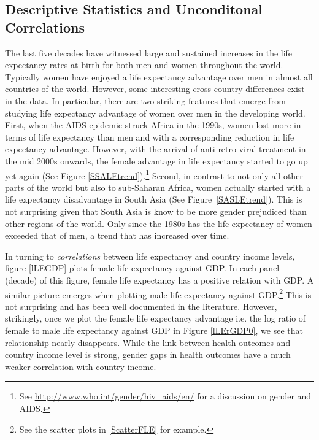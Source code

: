 \documentclass[11pt]{article}
\begin{document}
\begin{spacing}{1.4}
\subsection{Descriptive Statistics and Unconditonal Correlations} 
The last five decades have witnessed large and sustained increases in the life 
expectancy rates at birth for both men and women throughout the world. Typically 
women have enjoyed a life expectancy advantage over men in almost all countries 
of the world. However, some interesting cross country differences exist in the 
data. In particular, there are two striking features that emerge from studying 
life expectancy advantage of women over men in the developing world. First, when 
the AIDS epidemic struck Africa in the 1990s, women lost more in terms of life 
expectancy than men and with a corresponding reduction in life expectancy 
advantage. However, with the arrival of anti-retro viral treatment in the mid 
2000s onwards, the female advantage in life expectancy started to go up yet 
again (See Figure \ref{SSALEtrend}).\footnote{See 
\url{http://www.who.int/gender/hiv_aids/en/} for a discussion on gender and 
AIDS.} Second, in contrast to not only all other parts of the world but also to 
sub-Saharan Africa, women actually started with a life expectancy disadvantage 
in South Asia (See Figure~\ref{SASLEtrend}). This is not surprising given that 
South Asia is know to be more gender prejudiced than other regions of the world. 
Only since the 1980s has the life expectancy of women exceeded that of men, 
a trend that has increased over time.

In turning to \emph{correlations} between life expectancy and country income
levels, figure \ref{lLEGDP} plots female life expectancy against GDP. In each 
panel (decade) of this figure, female life expectancy has a positive relation 
with GDP. A similar picture emerges when plotting male life expectancy against 
GDP.\footnote{See the scatter plots in \ref{ScatterFLE} for example.} This is 
not surprising and has been well documented in the literature. However, 
strikingly, once we plot the female life expectancy advantage i.e. the log 
ratio of female to male life expectancy against GDP in Figure \ref{lLErGDP0}, we 
see that relationship nearly disappears. While the link between health outcomes
and country income level is strong, gender gaps in health outcomes have a much
weaker correlation with country income.


\end{spacing}
\end{document}
